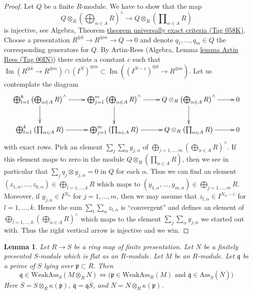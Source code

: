 \documentclass{amsart}
\theoremstyle{plain}
\newtheorem{lemma}[subsection]{Lemma}
\theoremstyle{definition}
\theoremstyle{remark}
\numberwithin{equation}{subsection}
\def\Im{\mathop{\mathrm{Im}}}
\begin{document}
\begin{proof}
\medskip\noindent
Let $Q$ be a finite $R$-module. We have to show that the map
$$
Q \otimes_R \left(\bigoplus\nolimits_{\alpha \in A} R\right)^\wedge
\longrightarrow
Q \otimes_R \left(\prod\nolimits_{\alpha \in A} R\right)
$$
is injective, see
Algebra, Theorem \href{https://stacks.math.columbia.edu/tag/058K}{theorem universally exact criteria (Tag 058K)}.
Choose a presentation $R^{\oplus k} \to R^{\oplus m} \to Q \to 0$
and denote $q_1, \ldots, q_m \in Q$ the corresponding generators for $Q$.
By Artin-Rees
(Algebra, Lemma \href{https://stacks.math.columbia.edu/tag/00IN}{lemma Artin Rees (Tag 00IN)})
there exists a constant $c$ such that
$\Im(R^{\oplus k} \to R^{\oplus m}) \cap (I^N)^{\oplus m}
\subset \Im((I^{N - c})^{\oplus k} \to R^{\oplus m})$.
Let us contemplate the diagram
$$
\xymatrix{
\bigoplus_{l = 1}^k \left(\bigoplus\nolimits_{\alpha \in A} R\right)^\wedge
\ar[r] \ar[d] &
\bigoplus_{j = 1}^m \left(\bigoplus\nolimits_{\alpha \in A} R\right)^\wedge
\ar[r] \ar[d] &
Q \otimes_R \left(\bigoplus\nolimits_{\alpha \in A} R\right)^\wedge
\ar[r] \ar[d] &
0 \\
\bigoplus_{l = 1}^k \left(\prod\nolimits_{\alpha \in A} R\right)
\ar[r] &
\bigoplus_{j = 1}^m \left(\prod\nolimits_{\alpha \in A} R\right)
\ar[r] &
Q \otimes_R \left(\prod\nolimits_{\alpha \in A} R\right)
\ar[r] &
0
}
$$
with exact rows. Pick an element $\sum_j \sum_\alpha y_{j, \alpha}$ of
$\bigoplus_{j = 1, \ldots, m}
\left(\bigoplus\nolimits_{\alpha \in A} R\right)^\wedge$.
If this element maps to zero in the module
$Q \otimes_R \left(\prod\nolimits_{\alpha \in A} R\right)$,
then we see in particular that
$\sum_j q_j \otimes y_{j, \alpha} = 0$ in $Q$ for each $\alpha$.
Thus we can find an element
$(z_{1, \alpha}, \ldots, z_{k, \alpha}) \in \bigoplus_{l = 1, \ldots, k} R$
which maps to
$(y_{1, \alpha}, \ldots, y_{m, \alpha}) \in \bigoplus_{j = 1, \ldots, m} R$.
Moreover, if $y_{j, \alpha} \in I^{N_\alpha}$ for $j = 1, \ldots, m$, then
we may assume that $z_{l, \alpha} \in I^{N_\alpha - c}$ for
$l = 1, \ldots, k$.
Hence the sum $\sum_l \sum_\alpha z_{l, \alpha}$ is ``convergent'' and
defines an element of
$\bigoplus_{l = 1, \ldots, k}
\left(\bigoplus\nolimits_{\alpha \in A} R\right)^\wedge$
which maps to the element $\sum_j \sum_\alpha y_{j, \alpha}$ we started
out with. Thus the right vertical arrow is injective and we win.
\end{proof}


\begin{lemma}
\label{lemma-weak-bourbaki-pre}
Let $R \to S$ be a ring map of finite presentation.
Let $N$ be a finitely presented $S$-module
which is flat as an $R$-module. Let $M$ be an $R$-module.
Let $\mathfrak q$ be a prime of $S$ lying over $\mathfrak p \subset R$.
Then
$$
\mathfrak q \in \text{WeakAss}_S(M \otimes_R N)
\Leftrightarrow
\Big(
\mathfrak p \in \text{WeakAss}_R(M)
\text{ and }
\overline{\mathfrak q} \in \text{Ass}_{\overline{S}}(\overline{N})
\Big)
$$
Here $\overline{S} = S \otimes_R \kappa(\mathfrak p)$,
$\overline{\mathfrak q} = \mathfrak q \overline{S}$, and
$\overline{N} = N \otimes_R \kappa(\mathfrak p)$.
\end{lemma}
\end{document}
